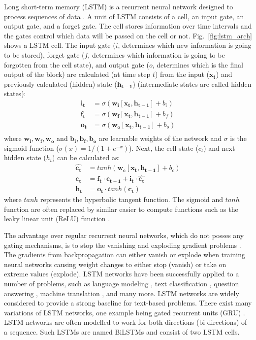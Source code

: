Long short-term memory (LSTM) is a recurrent neural network
designed to process sequences of data 
\citep{gers1999learning}. A unit of LSTM consists of 
a cell, an input gate, an output gate, and a forget gate.
The cell stores information over time intervals and the
gates control which data will be passed on the cell 
or not. Fig.~\ref{fig:lstm_arch} shows a LSTM cell.
The input gate ($i$, determines which new information is going to be stored), 
forget gate ($f$, determines which information is going to be forgotten from 
the cell state), and output gate ($o$, determines which is the final output 
of the block) 
are calculated (at time step $t$) from the input ($\mathbf{x_t}$) and 
previously calculated (hidden) state ($\mathbf{h_{t-1}}$) (intermediate states are 
called hidden states):
\begin{align*}
	\mathbf{i_t} &= \sigma(\mathbf{w_i} [\mathbf{x_t}, \mathbf{h_{t - 1}}] + b_i) \\
	\mathbf{f_t} &= \sigma(\mathbf{w_f} [\mathbf{x_t}, \mathbf{h_{t - 1}}] + b_f) \\
	\mathbf{o_t} &= \sigma(\mathbf{w_o} [\mathbf{x_t}, \mathbf{h_{t - 1}}] + b_o) \\
\end{align*}
where $\mathbf{w_i, w_f, w_o}$ and $\mathbf{b_i, b_f, b_o}$
are learnable weights of the network and $\sigma$ is the 
sigmoid function ($\sigma(x) = 1 / (1 + e^{-x})$). Next, the 
cell state ($c_t$) and next hidden state ($h_t$) can be calculated as:
\begin{align*}
	\mathbf{\hat{c_t}} &= tanh(\mathbf{w_c} [\mathbf{x_t}, \mathbf{h_{t - 1}}] + b_c) \\
	\mathbf{c_t} &= \mathbf{f_t} \cdot \mathbf{c_{t - 1}} + \mathbf{i_t} \cdot \mathbf{\hat{c_t}} \\
	\mathbf{h_t} &= \mathbf{o_t} \cdot \mathit{tanh}(\mathbf{c_t})
\end{align*}
where $\mathit{tanh}$ represents the hyperbolic tangent function. The sigmoid
and $\mathit{tanh}$ function are often replaced by similar easier to compute functions 
such as the leaky linear unit (ReLU) function \citep{agostinelli2014learning}. 

The advantage over regular recurrent neural networks, which do not posses any
gating mechanisms, is to stop the vanishing \citep{hochreiter1998vanishing} and
exploding gradient problems \citep{pascanu2012understanding}.  The gradients
from backpropagation can either vanish or explode when training neural networks
causing weight changes to either stop (vanish) or take on extreme values
(explode). LSTM networks have been successfully applied to a number of
problems, such as language modeling \citep{sundermeyer2012lstm}, text
classification \citep{zhou2015c}, question answering \citep{zhu2016visual7w},
machine translation \citep{luong2014addressing}, and many more. LSTM networks
are widely considered to provide a strong baseline for text-based problems.
There exist many variations of LSTM networks, one example being gated recurrent
units (GRU) \citep{chung2014empirical}. LSTM networks are often modelled to 
work for both directions (bi-directions) of a sequence. Such LSTMs are named  
BiLSTMs and consist of two LSTM cells. 

